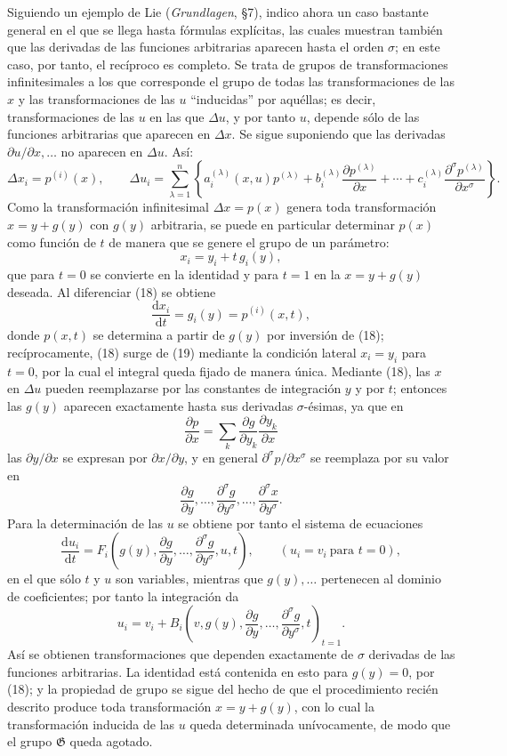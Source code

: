 \documentclass[11pt]{article}
\newcommand{\D}{\Delta}
\providecommand{\dd}{\mathrm d}
\providecommand{\G}{\mathfrak G}
\providecommand{\p}{\partial}
\begin{document}
Siguiendo un ejemplo de Lie (\emph{Grundlagen}, \S{}7), indico ahora un caso bastante general en el que se llega hasta fórmulas explícitas, las cuales muestran también que las derivadas de las funciones arbitrarias aparecen hasta el orden \(\sigma\); en este caso, por tanto, el recíproco es completo. Se trata de grupos de transformaciones infinitesimales a los que corresponde el grupo de todas las transformaciones de las \(x\) y las transformaciones de las \(u\) ``inducidas'' por aquéllas; es decir, transformaciones de las \(u\) en las que \(\D u\), y por tanto \(u\), depende sólo de las funciones arbitrarias que aparecen en \(\D x\). Se sigue suponiendo que las derivadas \(\p u/\p x,\ldots\) no aparecen en \(\D u\). Así:
\[
\D x_i=p^{(i)}(x),\qquad
\D u_i=
\sum_{\lambda=1}^{n}\left\{
a_i^{(\lambda)}(x,u)p^{(\lambda)}
+b_i^{(\lambda)}\frac{\p p^{(\lambda)}}{\p x}
+\cdots+
c_i^{(\lambda)}\frac{\p^\sigma p^{(\lambda)}}{\p x^\sigma}
\right\}.
\]
Como la transformación infinitesimal \(\D x=p(x)\) genera toda transformación \(x=y+g(y)\) con \(g(y)\) arbitraria, se puede en particular determinar \(p(x)\) como función de \(t\) de manera que se genere el grupo de un parámetro:
\begin{equation}
x_i=y_i+t\,g_i(y),
\tag{18}
\end{equation}
que para \(t=0\) se convierte en la identidad y para \(t=1\) en la \(x=y+g(y)\) deseada. Al diferenciar (18) se obtiene
\begin{equation}
\frac{\dd x_i}{\dd t}=g_i(y)=p^{(i)}(x,t),
\tag{19}
\end{equation}
donde \(p(x,t)\) se determina a partir de \(g(y)\) por inversión de (18); recíprocamente, (18) surge de (19) mediante la condición lateral \(x_i=y_i\) para \(t=0\), por la cual el integral queda fijado de manera única. Mediante (18), las \(x\) en \(\D u\) pueden reemplazarse por las constantes de integración \(y\) y por \(t\); entonces las \(g(y)\) aparecen exactamente hasta sus derivadas \(\sigma\)-ésimas, ya que en
\[
\frac{\p p}{\p x}=\sum_k\frac{\p g}{\p y_k}\frac{\p y_k}{\p x}
\]
las \(\p y/\p x\) se expresan por \(\p x/\p y\), y en general \(\p^\sigma p/\p x^\sigma\) se reemplaza por su valor en
\[
\frac{\p g}{\p y},\ldots,\frac{\p^\sigma g}{\p y^\sigma},\ldots,\frac{\p^\sigma x}{\p y^\sigma}.
\]
Para la determinación de las \(u\) se obtiene por tanto el sistema de ecuaciones
\[
\frac{\dd u_i}{\dd t}
=
F_i\!\left(g(y),\frac{\p g}{\p y},\ldots,\frac{\p^\sigma g}{\p y^\sigma},u,t\right),
\qquad (u_i=v_i\ \text{para }t=0),
\]
en el que sólo \(t\) y \(u\) son variables, mientras que \(g(y),\ldots\) pertenecen al dominio de coeficientes; por tanto la integración da
\[
u_i=v_i+
B_i\!\left(v,g(y),\frac{\p g}{\p y},\ldots,\frac{\p^\sigma g}{\p y^\sigma},t\right)_{t=1}.
\]
Así se obtienen transformaciones que dependen exactamente de \(\sigma\) derivadas de las funciones arbitrarias. La identidad está contenida en esto para \(g(y)=0\), por (18); y la propiedad de grupo se sigue del hecho de que el procedimiento recién descrito produce toda transformación \(x=y+g(y)\), con lo cual la transformación inducida de las \(u\) queda determinada unívocamente, de modo que el grupo \(\G\) queda agotado.
\end{document}
